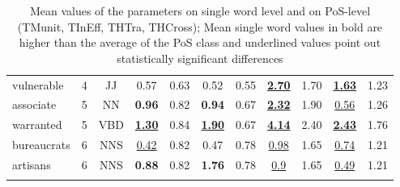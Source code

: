 \begin{table}
{\begin{tabular}{lrc *{8}{S[table-format=1.2]}}
 vulnerable	 & 4 & JJ & 0.57 & 0.63 & 0.52 & 0.55 & \bfseries \ul{2.70} & 1.70 & \bfseries \ul{1.63} & 1.23\\
 associate 	& 5 & NN & \bfseries 0.96 & 0.82 & \bfseries 0.94 & 0.67 & \bfseries \ul{2.32} & 1.90 & \ul{0.56} & 1.26\\
 warranted 	& 5 & VBD & \bfseries \ul{1.30} & 0.84 & \bfseries \ul{1.90} & 0.67 & \bfseries \ul{4.14} & 2.40 & \bfseries \ul{2.43} & 1.76\\
 bureaucrats 	& 6 & NNS & \ul{0.42} & 0.82 & 0.47 & 0.78 & \ul{0.98} & 1.65 & \ul{0.74} & 1.21\\
 artisans 	& 6 & NNS & \bfseries 0.88 & 0.82 & \bfseries 1.76 & 0.78 & \ul{0.9} & 1.65 & \ul{0.49} & 1.21\\
\lspbottomrule
\end{tabular}}
\caption{Mean values of the parameters on single word level and on PoS-level (TMunit, TInEff, THTra, THCross); Mean single word values in bold are higher than the average of the PoS class and underlined values point out statistically significant differences
}
\label{tab:D:3}
\end{table}

\begin{table}
\caption{Problematic words per formula, depending on $n*\text{sd}$, for all texts, Text 1 and Text 2}
\label{tab:D:4}
\end{table}

